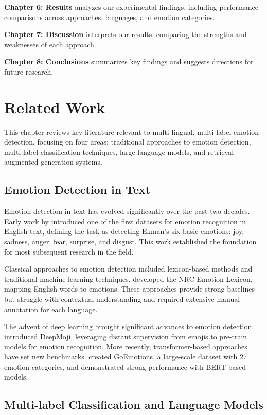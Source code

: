 \documentclass[a4paper,12pt]{extarticle}
\begin{document}
\textbf{Chapter 6: Results} analyzes our experimental findings, including performance comparisons across approaches, languages, and emotion categories.

\textbf{Chapter 7: Discussion} interprets our results, comparing the strengths and weaknesses of each approach.

\textbf{Chapter 8: Conclusions} summarizes key findings and suggests directions for future research.

\section{Related Work}

This chapter reviews key literature relevant to multi-lingual, multi-label emotion detection, focusing on four areas: traditional approaches to emotion detection, multi-label classification techniques, large language models, and retrieval-augmented generation systems.

\subsection{Emotion Detection in Text}

Emotion detection in text has evolved significantly over the past two decades. Early work by \cite{strapparava2007semeval} introduced one of the first datasets for emotion recognition in English text, defining the task as detecting Ekman's six basic emotions: joy, sadness, anger, fear, surprise, and disgust. This work established the foundation for most subsequent research in the field.

Classical approaches to emotion detection included lexicon-based methods and traditional machine learning techniques. \cite{mohammad2013crowdsourcing} developed the NRC Emotion Lexicon, mapping English words to emotions. These approaches provide strong baselines but struggle with contextual understanding and required extensive manual annotation for each language.

The advent of deep learning brought significant advances to emotion detection. \cite{felbo2017using} introduced DeepMoji, leveraging distant supervision from emojis to pre-train models for emotion recognition. More recently, transformer-based approaches have set new benchmarks. \cite{demszky2020goemotions} created GoEmotions, a large-scale dataset with 27 emotion categories, and demonstrated strong performance with BERT-based models.

\subsection{Multi-label Classification and Language Models}
\end{document}
